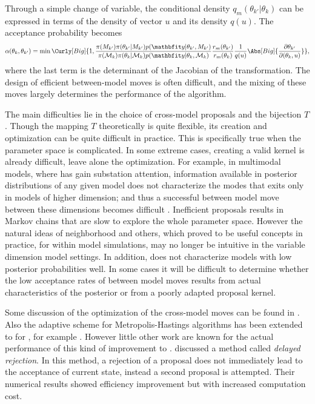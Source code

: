 Through a simple change of variable, the conditional density
$q_m(\theta_{k'}|\theta_k)$ can be expressed in terms of the density of vector
$u$ and its density $q(u)$. The acceptance probability becomes
\begin{equation}
  \alpha(\theta_k,\theta_{k'}) =
  \min\Curly[Big]{1,
    \frac{\pi(M_{k'})\pi(\theta_{k'}|M_{k'})p(\data|\theta_{k'},M_{k'})}
    {\pi(\calM_k)\pi(\theta_k|\calM_k)p(\data|\theta_k,\calM_k)}
    \frac{r_m(\theta_{k'})}{r_m(\theta_k)}
    \frac{1}{q(u)}\Abs[Big]{\frac{\partial\theta_{k'}}{\partial(\theta_k,u)}}
  },
\end{equation}
where the last term is the determinant of the Jacobian of the transformation.
The design of efficient between-model moves is often difficult, and the mixing
of these moves largely determines the performance of the algorithm.

The main difficulties lie in the choice of cross-model proposals and the
bijection $T$. Though the mapping $T$ theoretically is quite flexible, its
creation and optimization can be quite difficult in practice. This is
specifically true when the parameter space is complicated. In some extreme
cases, creating a valid kernel is already difficult, leave alone the
optimization. For example, in multimodal models, where \rjmcmc has gain
substation attention, information available in posterior distributions of any
given model does not characterize the modes that exits only in models of
higher dimension; and thus a successful between model move between these
dimensions becomes difficult \cite{Jasra:2007id}. Inefficient proposals
results in Markov chains that are slow to explore the whole parameter space.
However the natural ideas of neighborhood and others, which proved to be
useful concepts in practice, for within model simulations, may no longer be
intuitive in the variable dimension model settings. In addition, \rjmcmc does
not characterize models with low posterior probabilities well. In some cases
it will be difficult to determine whether the low acceptance rates of between
model moves results from actual characteristics of the posterior or from a
poorly adapted proposal kernel.

Some discussion of the optimization of the cross-model moves can be found in
\cite{Green:2009tr}. Also the adaptive scheme for Metropolis-Hastings
algorithms has been extended to for \rjmcmc, for example \cite{Hastie:2005vi}.
However little other work are known for the actual performance of this kind of
improvement to \rjmcmc. \cite{Green:2001tk} discussed a method called
\emph{delayed rejection}. In this method, a rejection of a proposal does not
immediately lead to the acceptance of current state, instead a second proposal
is attempted. Their numerical results showed efficiency improvement but with
increased computation cost.

